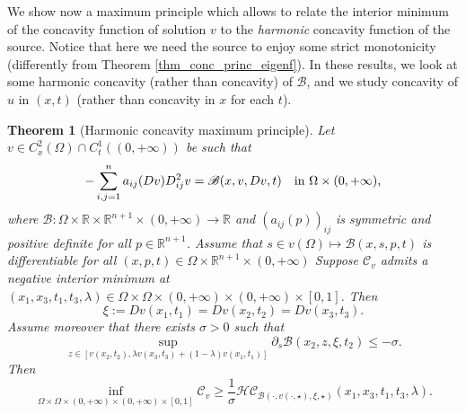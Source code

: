 \documentclass[11pt, reqno]{amsart}
\newtheorem{theorem}[lemma]{Theorem}
\theoremstyle{definition}
\numberwithin{equation}{section}
\newcommand{\R}{\mathbb{R}}
\begin{document}
We show now a maximum principle which allows to relate the interior minimum of the concavity function of solution $v$ to the \emph{harmonic} concavity function of the source. 
Notice that here we need the source to enjoy some strict monotonicity (differently from Theorem \ref{thm_conc_princ_eigenf}). 
In these results, we look at some harmonic concavity (rather than concavity) of $\mathscr{B}$, and we study concavity of $u$ in $(x,t)$ (rather than concavity in $x$ for each $t$).

\begin{theorem}[Harmonic concavity maximum principle]
\label{Concavity perturbative maximum principle for parabolic equations} 
	Let $v\in C^2_x(\Omega) \cap C^1_t((0,+\infty))$ be such that 
	\begin{equation*}
- \sum_{i,j=1}^{n}a_{ij}(Dv)D^2_{ij}v = \mathscr{B}(x,v,Dv, t) \quad \hbox{in $\Omega \times (0,+\infty)$,}
	\end{equation*}
	where $\mathscr{B}\colon\Omega\times \R\times \R^{n+1} \times (0,+\infty)\to \R $ and $(a_{ij}(p))_{ij}$ is symmetric and positive definite for all $p\in \R^{n+1}$. 
	Assume that $s \in v(\Omega) \mapsto \mathscr{B}(x,s,p,t)$ is differentiable 	for all $(x,p,t)\in \Omega\times \R^{n+1} \times (0,+\infty)$ 
	Suppose $\mathcal{C}_v$ admits a negative interior minimum at $(x_1,x_3,t_1,t_3,\lambda)\in \Omega \times \Omega \times (0,+\infty)\times (0,+\infty)\times [0,1]$. 
	Then
	\begin{equation}\label{eq_def_xi}
	\xi:=Dv(x_1,t_1)=Dv(x_2,t_2)=Dv(x_3,t_3).
	\end{equation}
	Assume moreover that there exists $\sigma>0$ such that
	\begin{equation}\label{strictly decreasing eqt}
		\sup_{z\in [v(x_2,t_2),\lambda v(x_3,t_3)+(1-\lambda)v(x_1,t_1)]} \partial_s\mathscr{B}(x_2,z,\xi, 	t_2)\leq-\sigma.
	\end{equation}
	Then
\begin{equation}\label{eq_harm_concav_quantit}
\inf_{\Omega\times \Omega \times (0,+\infty)\times (0,+\infty)\times[0,1]}\mathcal{C}_v\geq \dfrac{1}{\sigma} \mathcal{HC}_{\mathscr{B}(\cdot, v(\cdot,\star), \xi, \star)}(x_1,x_3,t_1,t_3,\lambda). 
\end{equation}
\end{theorem}
\end{document}
